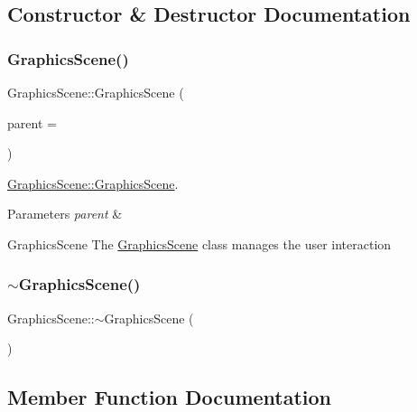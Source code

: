 \subsection{Constructor \& Destructor Documentation}
\mbox{\label{class_graphics_scene_a8e12dad680e5944c7ecce5b399595742}} 
\subsubsection{\texorpdfstring{Graphics\+Scene()}{GraphicsScene()}}
{\footnotesize\ttfamily Graphics\+Scene\+::\+Graphics\+Scene (\begin{DoxyParamCaption}\item[{Q\+Object $\ast$}]{parent = {} }\end{DoxyParamCaption})\hspace{0.3cm}{\ttfamily [explicit]}}



\hyperlink{class_graphics_scene_a8e12dad680e5944c7ecce5b399595742}{Graphics\+Scene\+::\+Graphics\+Scene}. 


\begin{DoxyParams}{Parameters}
{\em parent} & \\
\hline
\end{DoxyParams}
\begin{DoxyParagraph}{Graphics\+Scene}
The \hyperlink{class_graphics_scene}{Graphics\+Scene} class manages the user interaction 
\end{DoxyParagraph}
\mbox{\label{class_graphics_scene_a49bf5569f93aa92ecf99c89c14a0b17d}} 
\subsubsection{\texorpdfstring{$\sim$\+Graphics\+Scene()}{~GraphicsScene()}}
{\footnotesize\ttfamily Graphics\+Scene\+::$\sim$\+Graphics\+Scene (\begin{DoxyParamCaption}{ }\end{DoxyParamCaption})}



\subsection{Member Function Documentation}
\mbox{\label{class_graphics_scene_aa6c883ed523812e7aec5018888b72ee1}} 
